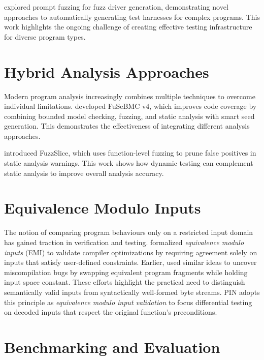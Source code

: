 \documentclass[doublespace,nopageskip]{VTthesis} %
\begin{document}
    \citet{jin2024prompt} explored prompt fuzzing for fuzz driver generation, demonstrating novel approaches to automatically generating test harnesses for complex programs. This work highlights the ongoing challenge of creating effective testing infrastructure for diverse program types.
    
\section{Hybrid Analysis Approaches} \label{se:hybrid_analysis}

Modern program analysis increasingly combines multiple techniques to overcome individual limitations. \citet{fusebmc2022} developed FuSeBMC v4, which improves code coverage by combining bounded model checking, fuzzing, and static analysis with smart seed generation. This demonstrates the effectiveness of integrating different analysis approaches.

\citet{fuzzslice2024} introduced FuzzSlice, which uses function-level fuzzing to prune false positives in static analysis warnings. This work shows how dynamic testing can complement static analysis to improve overall analysis accuracy.

\section{Equivalence Modulo Inputs} \label{se:emi_background}

The notion of comparing program behaviours only on a restricted input domain has gained traction in verification and testing. \citet{le2014emi} formalized \emph{equivalence modulo inputs} (EMI) to validate compiler optimizations by requiring agreement solely on inputs that satisfy user-defined constraints. Earlier, \citet{yang2011finding} used similar ideas to uncover miscompilation bugs by swapping equivalent program fragments while holding input space constant. These efforts highlight the practical need to distinguish semantically valid inputs from syntactically well-formed byte streams. PIN adopts this principle as \emph{equivalence modulo input validation} to focus differential testing on decoded inputs that respect the original function's preconditions.
    
    \section{Benchmarking and Evaluation} \label{se:benchmarking}
    
\end{document}
